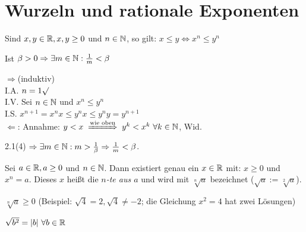 \documentclass[a4paper,twoside,DIV15,BCOR12mm]{scrbook}
\begin{document}
\chapter{Wurzeln und rationale Exponenten}

\begin{wichtigerhilfssatz}
\begin{liste}
\item Sind $x,y\in\mathbb{R}, x,y\ge0$ und $n\in\mathbb{N}$, so gilt: $x\le y\Leftrightarrow x^{n}\le y^{n}$
\item Ist $\beta > 0\Rightarrow \exists m\in\mathbb{N}:\frac{1}{m} < \beta$
\end{liste}
\end{wichtigerhilfssatz}

\begin{beweise}
\item \glqq$\Rightarrow$\grqq (induktiv)\\
I.A. $n = 1 \surd$\\
I.V. Sei $n\in\mathbb{N}$ und $x^{n}\le y^{n}$\\
I.S. $x^{n+1}=x^{n}x\le y^{n}x\le y^{n}y=y^{n+1}$\\
\glqq$\Leftarrow$\grqq: Annahme: $y < x \folgtwegen{\text{wie oben}} y^{k} < x^{k} \ \forall k\in\MdN$, Wid.
\item 2.1(4) $\Rightarrow \exists m\in\mathbb{N}:m>\frac{1}{\beta}\Rightarrow\frac{1}{m}<\beta$.
\end{beweise}

\begin{wichtigedefinition}[Wurzeln]
Sei $a\in\mathbb{R}, a\ge0$ und $n\in\mathbb{N}$. Dann existiert genau ein $x\in\mathbb{R}$ mit: $x\ge0$ und $x^{n}=a$. Dieses $x$ heißt die \textit{$n$-te  aus $a$} und wird mit $\sqrt[n]{a}$ bezeichnet ($\sqrt{a} := \sqrt[2]{a}$).
\end{wichtigedefinition}

\begin{bemerkung}
\begin{liste}
\item $\sqrt[n]{a}\ge0$ (Beispiel: $\sqrt{4}=2, \sqrt{4}\ne-2$; die Gleichung $x^{2}=4$ hat zwei Lösungen)
\item $\sqrt{b^{2}}=|b|  \ \forall b\in\mathbb{R}$
\end{liste}
\end{bemerkung}
\end{document}
